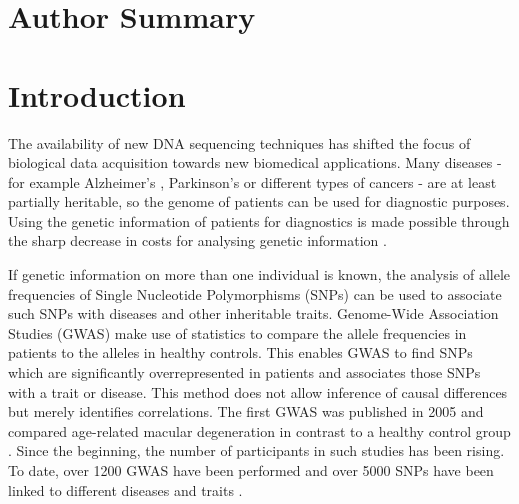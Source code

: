 \documentclass[10pt]{article}
\begin{document}
\section*{Author Summary}

\section*{Introduction}

The availability of new DNA sequencing techniques has shifted the focus of biological data acquisition towards new biomedical applications.
Many diseases - for example Alzheimer's \cite{alzheimer}, Parkinson's \cite{parkinsons} or different types of cancers \cite{breastcancer,prostatecancer} - are at least partially heritable, so the genome 
of patients can be used for diagnostic purposes. Using the genetic information of patients for diagnostics is made possible through the sharp decrease in costs for analysing genetic information \cite{Brown1999}. 



If genetic information on more than one individual is known, the analysis of
allele frequencies of Single Nucleotide Polymorphisms (SNPs) can be used to associate such SNPs with diseases and other inheritable traits. Genome-Wide Association Studies
(GWAS) make use of statistics to compare the allele frequencies in patients to the alleles in healthy controls. This
enables GWAS to find SNPs which are significantly overrepresented in patients and associates those SNPs with a trait or disease.
This method does not allow inference of causal differences but merely identifies correlations. 
The first GWAS was published in 2005 and compared age-related macular degeneration in contrast 
to a healthy control group \cite{Klein2005}. Since the beginning, the number of participants in 
such studies has been rising. To date, over 1200 GWAS have been performed \cite{Johnson2009} and over 
5000 SNPs have been linked to different diseases and traits \cite{Hindorff2009}.   
\end{document}
